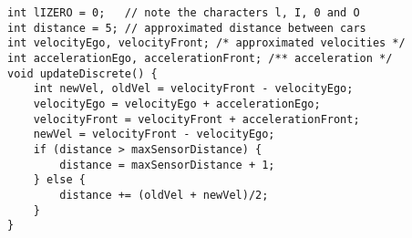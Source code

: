 \begin{lstlisting}[language={[GUI]Uppaal},
  caption={\uppaal code example listing.},
  label={lst:example}]
int lIZERO = 0;   // note the characters l, I, 0 and O
int distance = 5; // approximated distance between cars
int velocityEgo, velocityFront; /* approximated velocities */
int accelerationEgo, accelerationFront; /** acceleration */
void updateDiscrete() {
    int newVel, oldVel = velocityFront - velocityEgo;
    velocityEgo = velocityEgo + accelerationEgo;
    velocityFront = velocityFront + accelerationFront;
    newVel = velocityFront - velocityEgo;
    if (distance > maxSensorDistance) {
        distance = maxSensorDistance + 1;
    } else {
        distance += (oldVel + newVel)/2;
    }
}
\end{lstlisting}

